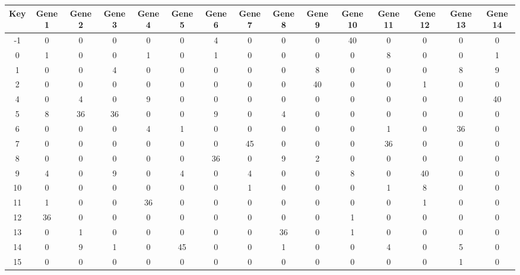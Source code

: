 \begin{tabular}{|c|c|c|c|c|c|c|c|c|c|c|c|c|c|c|}
\hline
Key & Gene 1 & Gene 2 & Gene 3 & Gene 4 & Gene 5 & Gene 6 & Gene 7 & Gene 8 & Gene 9 & Gene 10 & Gene 11 & Gene 12 & Gene 13 & Gene 14 \\
\hline
-1 & 0 & 0 & 0 & 0 & 0 & 4 & 0 & 0 & 0 & 40 & 0 & 0 & 0 & 0 \\
0 & 1 & 0 & 0 & 1 & 0 & 1 & 0 & 0 & 0 & 0 & 8 & 0 & 0 & 1 \\
1 & 0 & 0 & 4 & 0 & 0 & 0 & 0 & 0 & 8 & 0 & 0 & 0 & 8 & 9 \\
2 & 0 & 0 & 0 & 0 & 0 & 0 & 0 & 0 & 40 & 0 & 0 & 1 & 0 & 0 \\
4 & 0 & 4 & 0 & 9 & 0 & 0 & 0 & 0 & 0 & 0 & 0 & 0 & 0 & 40 \\
5 & 8 & 36 & 36 & 0 & 0 & 9 & 0 & 4 & 0 & 0 & 0 & 0 & 0 & 0 \\
6 & 0 & 0 & 0 & 4 & 1 & 0 & 0 & 0 & 0 & 0 & 1 & 0 & 36 & 0 \\
7 & 0 & 0 & 0 & 0 & 0 & 0 & 45 & 0 & 0 & 0 & 36 & 0 & 0 & 0 \\
8 & 0 & 0 & 0 & 0 & 0 & 36 & 0 & 9 & 2 & 0 & 0 & 0 & 0 & 0 \\
9 & 4 & 0 & 9 & 0 & 4 & 0 & 4 & 0 & 0 & 8 & 0 & 40 & 0 & 0 \\
10 & 0 & 0 & 0 & 0 & 0 & 0 & 1 & 0 & 0 & 0 & 1 & 8 & 0 & 0 \\
11 & 1 & 0 & 0 & 36 & 0 & 0 & 0 & 0 & 0 & 0 & 0 & 1 & 0 & 0 \\
12 & 36 & 0 & 0 & 0 & 0 & 0 & 0 & 0 & 0 & 1 & 0 & 0 & 0 & 0 \\
13 & 0 & 1 & 0 & 0 & 0 & 0 & 0 & 36 & 0 & 1 & 0 & 0 & 0 & 0 \\
14 & 0 & 9 & 1 & 0 & 45 & 0 & 0 & 1 & 0 & 0 & 4 & 0 & 5 & 0 \\
15 & 0 & 0 & 0 & 0 & 0 & 0 & 0 & 0 & 0 & 0 & 0 & 0 & 1 & 0 \\
\hline
\end{tabular}